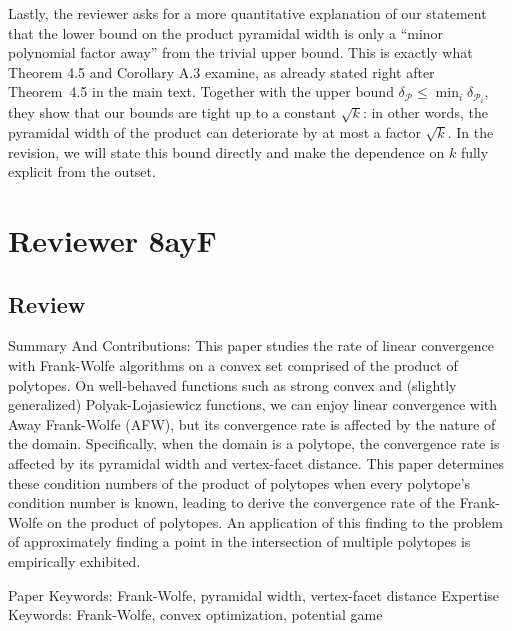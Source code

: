 \documentclass[a4wide]{article}
\begin{document}
Lastly, the reviewer asks for a more quantitative explanation of our statement that the lower bound on the product pyramidal width is only a ``minor polynomial factor away'' from the trivial upper bound.
This is exactly what Theorem 4.5 and Corollary A.3 examine, as already stated right after Theorem~4.5 in the main text. 
Together with the upper bound $\delta_{\mathcal{P}} \le \min_i \delta_{\mathcal{P}_i}$, they show that our bounds are tight up to a constant $\sqrt{k}$: in other words, the pyramidal width of the product can deteriorate by at most a factor $\sqrt{k}$.
In the revision, we will state this bound directly and make the dependence on $k$ fully explicit from the outset.











\section*{Reviewer 8ayF}

\subsection*{Review}
Summary And Contributions:
This paper studies the rate of linear convergence with Frank-Wolfe algorithms on a convex set comprised of the product of polytopes. On well-behaved functions such as strong convex and (slightly generalized) Polyak-Lojasiewicz functions, we can enjoy linear convergence with Away Frank-Wolfe (AFW), but its convergence rate is affected by the nature of the domain. Specifically, when the domain is a polytope, the convergence rate is affected by its pyramidal width and vertex-facet distance. This paper determines these condition numbers of the product of polytopes when every polytope's condition number is known, leading to derive the convergence rate of the Frank-Wolfe on the product of polytopes. An application of this finding to the problem of approximately finding a point in the intersection of multiple polytopes is empirically exhibited.

Paper Keywords: Frank-Wolfe, pyramidal width, vertex-facet distance
Expertise Keywords: Frank-Wolfe, convex optimization, potential game
\end{document}
